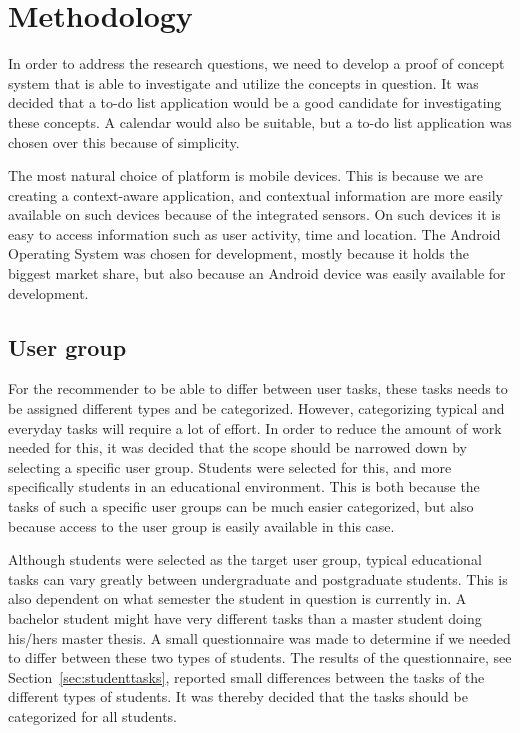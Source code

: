 \chapter{Methodology}
\label{chap:methodology}

In order to address the research questions, we need to develop a proof of concept system that is able to investigate and utilize the concepts in question. It was decided that a to-do list application would be a good candidate for investigating these concepts. A calendar would also be suitable, but a to-do list application was chosen over this because of simplicity.

The most natural choice of platform is mobile devices. This is because we are creating a context-aware application, and contextual information are more easily available on such devices because of the integrated sensors. On such devices it is easy to access information such as user activity, time and location. The Android Operating System was chosen for development, mostly because it holds the biggest market share, but also because an Android device was easily available for development.



\section{User group}
For the recommender to be able to differ between user tasks, these tasks needs to be assigned different types and be categorized. However, categorizing typical and everyday tasks will require a lot of effort. In order to reduce the amount of work needed for this, it was decided that the scope should be narrowed down by selecting a specific user group. Students were selected for this, and more specifically students in an educational environment. This is both because the tasks of such a specific user groups can be much easier categorized, but also because access to the user group is easily available in this case.

Although students were selected as the target user group, typical educational tasks can vary greatly between undergraduate and postgraduate students. This is also dependent on what semester the student in question is currently in. A bachelor student might have very different tasks than a master student doing his/hers master thesis. A small questionnaire was made to determine if we needed to differ between these two types of students. The results of the questionnaire, see Section~\ref{sec:studenttasks}, reported small differences between the tasks of the different types of students. It was thereby decided that the tasks should be categorized for all students.



